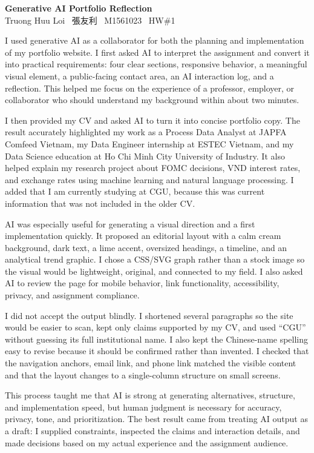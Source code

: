 \documentclass[11pt]{article}
\begin{document}
\color{ink}
{\Large\bfseries Generative AI Portfolio Reflection\\[4pt]}
{\color{orange}\small Truong Huu Loi \textbar\ 張友利 \textbar\ M1561023 \textbar\ HW\#1}

\vspace{12pt}
I used generative AI as a collaborator for both the planning and implementation of my portfolio website. I first asked AI to interpret the assignment and convert it into practical requirements: four clear sections, responsive behavior, a meaningful visual element, a public-facing contact area, an AI interaction log, and a reflection. This helped me focus on the experience of a professor, employer, or collaborator who should understand my background within about two minutes.

I then provided my CV and asked AI to turn it into concise portfolio copy. The result accurately highlighted my work as a Process Data Analyst at JAPFA Comfeed Vietnam, my Data Engineer internship at ESTEC Vietnam, and my Data Science education at Ho Chi Minh City University of Industry. It also helped explain my research project about FOMC decisions, VND interest rates, and exchange rates using machine learning and natural language processing. I added that I am currently studying at CGU, because this was current information that was not included in the older CV.

AI was especially useful for generating a visual direction and a first implementation quickly. It proposed an editorial layout with a calm cream background, dark text, a lime accent, oversized headings, a timeline, and an analytical trend graphic. I chose a CSS/SVG graph rather than a stock image so the visual would be lightweight, original, and connected to my field. I also asked AI to review the page for mobile behavior, link functionality, accessibility, privacy, and assignment compliance.

I did not accept the output blindly. I shortened several paragraphs so the site would be easier to scan, kept only claims supported by my CV, and used “CGU” without guessing its full institutional name. I also kept the Chinese-name spelling easy to revise because it should be confirmed rather than invented. I checked that the navigation anchors, email link, and phone link matched the visible content and that the layout changes to a single-column structure on small screens.

This process taught me that AI is strong at generating alternatives, structure, and implementation speed, but human judgment is necessary for accuracy, privacy, tone, and prioritization. The best result came from treating AI output as a draft: I supplied constraints, inspected the claims and interaction details, and made decisions based on my actual experience and the assignment audience.
\end{document}
